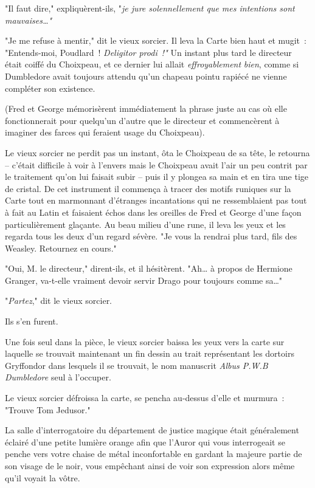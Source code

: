 "Il faut dire," expliquèrent-ils, "\emph{je jure solennellement que mes intentions sont mauvaises…"}

"Je me refuse à mentir," dit le vieux sorcier. Il leva la Carte bien haut et mugit~: "Entends-moi, Poudlard~! \emph{Deligitor prodi~!"} Un instant plus tard le directeur était coiffé du Choixpeau, et ce dernier lui allait \emph{effroyablement} \emph{bien}, comme si Dumbledore avait toujours attendu qu'un chapeau pointu rapiécé ne vienne compléter son existence.

(Fred et George mémorisèrent immédiatement la phrase juste au cas où elle fonctionnerait pour quelqu'un d'autre que le directeur et commencèrent à imaginer des farces qui feraient usage du Choixpeau).

Le vieux sorcier ne perdit pas un instant, ôta le Choixpeau de sa tête, le retourna -- c'était difficile à voir à l'envers mais le Choixpeau avait l'air un peu contrit par le traitement qu'on lui faisait subir -- puis il y plongea sa main et en tira une tige de cristal. De cet instrument il commença à tracer des motifs runiques sur la Carte tout en marmonnant d'étranges incantations qui ne ressemblaient pas tout à fait au Latin et faisaient échos dans les oreilles de Fred et George d'une façon particulièrement glaçante. Au beau milieu d'une rune, il leva les yeux et les regarda tous les deux d'un regard sévère. "Je vous la rendrai plus tard, fils des Weasley. Retournez en cours."

"Oui, M. le directeur," dirent-ils, et il hésitèrent. "Ah… à propos de Hermione Granger, va-t-elle vraiment devoir servir Drago pour toujours comme sa…"

"\emph{Partez}," dit le vieux sorcier.

Ils s'en furent.

Une fois seul dans la pièce, le vieux sorcier baissa les yeux vers la carte sur laquelle se trouvait maintenant un fin dessin au trait représentant les dortoirs Gryffondor dans lesquels il se trouvait, le nom manuscrit \emph{Albus P.W.B Dumbledore} seul à l'occuper.

Le vieux sorcier défroissa la carte, se pencha au-dessus d'elle et murmura~: "Trouve Tom Jedusor."

\later

La salle d'interrogatoire du département de justice magique était généralement éclairé d'une petite lumière orange afin que l'Auror qui vous interrogeait se penche vers votre chaise de métal inconfortable en gardant la majeure partie de son visage de le noir, vous empêchant ainsi de voir son expression alors même qu'il voyait la vôtre.

